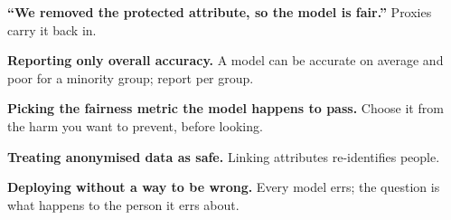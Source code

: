 \begin{pitfall}
\begin{tight}
  \item \textbf{``We removed the protected attribute, so the model is fair.''}
        Proxies carry it back in.
  \item \textbf{Reporting only overall accuracy.} A model can be accurate on
        average and poor for a minority group; report per group.
  \item \textbf{Picking the fairness metric the model happens to pass.} Choose it
        from the harm you want to prevent, before looking.
  \item \textbf{Treating anonymised data as safe.} Linking attributes re-identifies
        people.
  \item \textbf{Deploying without a way to be wrong.} Every model errs; the question is
        what happens to the person it errs about.
\end{tight}
\end{pitfall}

